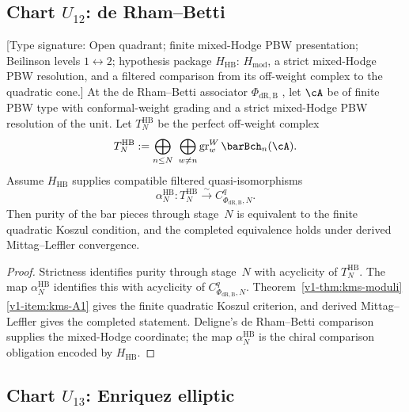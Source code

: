 \subsection{Chart $U_{12}$: de Rham--Betti}

\begin{proposition}
\label{v1-prop:kms-hodge-betti-chart}
\ClaimStatusConditional
\textup{[Type signature: Open quadrant; finite mixed-Hodge PBW
presentation; Beilinson levels $1\leftrightarrow2$; hypothesis
package $H_{\mathrm{HB}}$: $H_{\mathrm{mod}}$, a strict
mixed-Hodge PBW resolution, and a filtered comparison from its
off-weight complex to the quadratic cone.]}
At the de Rham--Betti associator $\Phi_{\mathrm{dR,B}}$
\cite{Deligne89}, let $\cA$ be of finite PBW type with
conformal-weight grading and a strict mixed-Hodge PBW
resolution of the unit.  Let $T^{\mathrm{HB}}_N$ be the perfect
off-weight complex
\[
 T^{\mathrm{HB}}_N
 :=\bigoplus_{n\leq N}\ \bigoplus_{w\neq n}
 \operatorname{gr}^W_w\barBch_n(\cA).
\]
Assume $H_{\mathrm{HB}}$ supplies compatible filtered
quasi-isomorphisms
\[
 \alpha^{\mathrm{HB}}_N\colon
 T^{\mathrm{HB}}_N\xrightarrow{\sim}
 C^q_{\Phi_{\mathrm{dR,B}},N}.
\]
Then purity of the bar pieces through stage~$N$ is equivalent to the
finite quadratic Koszul condition, and the completed equivalence
holds under derived Mittag--Leffler convergence.
\end{proposition}

\begin{proof}
Strictness identifies purity through stage~$N$ with acyclicity of
$T^{\mathrm{HB}}_N$.  The map $\alpha^{\mathrm{HB}}_N$ identifies
this with acyclicity of $C^q_{\Phi_{\mathrm{dR,B}},N}$.
Theorem~\ref{v1-thm:kms-moduli}\ref{v1-item:kms-A1} gives the
finite quadratic Koszul criterion, and derived Mittag--Leffler gives
the completed statement.  Deligne's de Rham--Betti comparison
\cite{Deligne89} supplies the mixed-Hodge coordinate; the map
$\alpha^{\mathrm{HB}}_N$ is the chiral comparison obligation encoded
by $H_{\mathrm{HB}}$.
\end{proof}

\subsection{Chart $U_{13}$: Enriquez elliptic}

